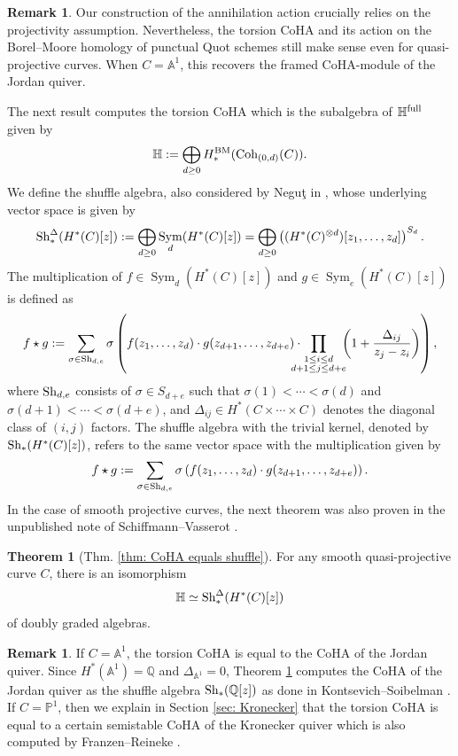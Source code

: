 \documentclass[10pt]{amsart}
\newcommand{\BA}{\mathbb{A}}
\newcommand{\BQ}{\mathbb{Q}}
\newcommand{\BP}{\mathbb{P}}
\newcommand{\BH}{\mathbb{H}}
\newcommand{\Coh}{\textnormal{Coh}}
\newcommand{\BM}{\textnormal{BM}}
\newcommand{\+}{{}^+}
\newcommand{\full}{\textnormal{full}}
\newcommand{\Sh}{\textnormal{Sh}}
\DeclareMathOperator{\Sym}{Sym}
\theoremstyle{definition}
\theoremstyle {definition}
\newtheorem{remark}[theorem]{Remark}
\theoremstyle {definition}
\newtheorem{introtheorem}{Theorem}
\begin{document}
\begin{remark}
    Our construction of the annihilation action crucially relies on the projectivity assumption. Nevertheless, the torsion CoHA and its action on the Borel--Moore homology of punctual Quot schemes still make sense even for quasi-projective curves. When $C=\BA^1$, this recovers the framed CoHA-module of the Jordan quiver. 
\end{remark}

The next result computes the torsion CoHA which is the subalgebra of $\BH^\full$ given by 
$$\BH:=\bigoplus_{d\geq 0} H^\BM_*(\Coh_{(0,d)}(C)). 
$$
We define the shuffle algebra, also considered by Negu\c t in \cite[Sec. 4.7]{N2}, whose underlying vector space is given by 
$$\Sh^\Delta_{*}(H^*(C)[z]):=\bigoplus_{d\geq 0}\Sym_d(H^*(C)[z])=\bigoplus_{d\geq 0} \left(
(H^*(C)^{\otimes d})[z_1,\dots, z_d]
\right)^{S_d}. 
$$
The multiplication of $f\in \Sym_d(H^*(C)[z])$ and $g\in \Sym_e(H^*(C)[z])$ is defined as 
$$f\star g:=\sum_{\sigma\in \Sh_{d,e}}\sigma\left(
f(z_1,\dots, z_d)\cdot g(z_{d+1},\dots, z_{d+e})\cdot \hspace{-10pt}\prod_{\substack{1\leq i\leq d\\d+1\leq j\leq d+e}}
\hspace{-5pt}\left(1+\frac{\Delta_{ij}}{z_j-z_i}\right)
\right),
$$
where $\Sh_{d,e}$ consists of $\sigma\in S_{d+e}$ such that $\sigma(1)<\cdots<\sigma(d)$ and $\sigma(d+1)<\cdots<\sigma(d+e)$, and $\Delta_{ij}\in H^*(C\times \cdots \times C)$ denotes the diagonal class of $(i,j)$ factors. The shuffle algebra with the trivial kernel, denoted by $\Sh_{*}(H^*(C)[z])$, refers to the same vector space with the multiplication given by 
$$f\star g:=\sum_{\sigma\in \Sh_{d,e}}\sigma\left(
f(z_1,\dots, z_d)\cdot g(z_{d+1},\dots, z_{d+e})
\right).
$$
In the case of smooth projective curves, the next theorem was also proven in the unpublished note of Schiffmann--Vasserot \cite{SV_unpublished}.

\begin{introtheorem}[Thm. \ref{thm: CoHA equals shuffle}]\label{introthm: CoHA equals shuffle}
    For any smooth quasi-projective curve $C$, there is an isomorphism
    $$\BH\simeq \Sh^\Delta_{*}(H^*(C)[z])$$
    of doubly graded algebras.
\end{introtheorem}

\begin{remark}
    If $C=\BA^1$, the torsion CoHA is equal to the CoHA of the Jordan quiver. Since $H^*(\BA^1)=\BQ$ and $\Delta_{\BA^1}=0$, Theorem \ref{introthm: CoHA equals shuffle} computes the CoHA of the Jordan quiver as the shuffle algebra $\Sh_{*}(\BQ[z])$ as done in Kontsevich--Soibelman \cite[Sec. 2.5]{Kontsevich_Soibelman}.  If $C=\BP^1$, then we explain in Section \ref{sec: Kronecker} that the torsion CoHA is equal to a certain semistable CoHA of the Kronecker quiver which is also computed by Franzen--Reineke \cite{franzen2019cohomological}. 
\end{remark}
\end{document}
